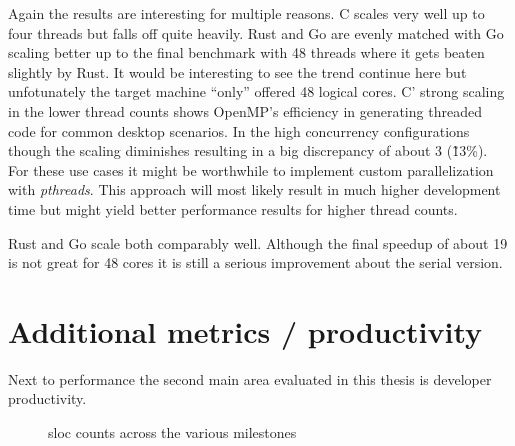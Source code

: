 Again the results are interesting for multiple reasons. C scales very well up to four threads but falls off quite heavily. Rust and Go are evenly matched with Go scaling better up to the final benchmark with 48 threads where it gets beaten slightly by Rust. It would be interesting to see the trend continue here but unfotunately the target machine ``only'' offered 48 logical cores. C' strong scaling in the lower thread counts shows OpenMP's efficiency in generating threaded code for common desktop scenarios. In the high concurrency configurations though the scaling diminishes resulting in a big discrepancy of about 3 (\~13\%). For these use cases it might be worthwhile to implement custom parallelization with \textit{pthreads}. This approach will most likely result in much higher development time but might yield better performance results for higher thread counts.

Rust and Go scale both comparably well. Although the final speedup of about 19 is not great for 48 cores it is still a serious improvement about the serial version.

\section{Additional metrics / productivity}
\label{sec:Evaluation::Metrics}

Next to performance the second main area evaluated in this thesis is developer productivity.

\begin{figure}
    \centering
    \label{fig:sloc_graph}
    \caption{\gls{sloc} counts across the various milestones}
\end{figure}


